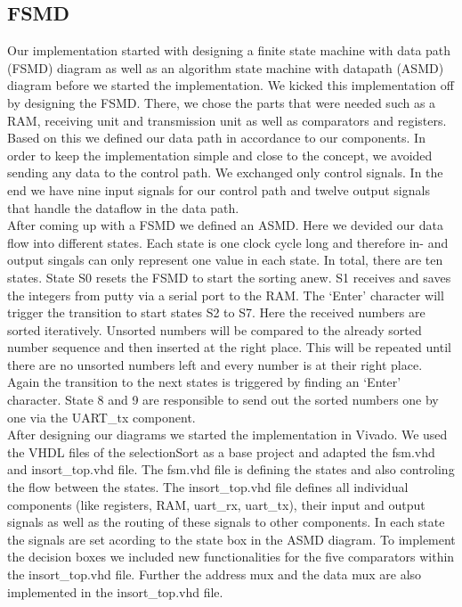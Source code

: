 \documentclass[conference]{IEEEtran}
\begin{document}
\subsection{FSMD}\label{section:fsmd}
Our implementation started with designing a finite state machine with data path (FSMD) diagram as well as an algorithm state machine with datapath (ASMD) diagram before we started the implementation. We kicked this implementation off by designing the FSMD. There, we chose the parts that were needed such as a RAM, receiving unit and transmission unit as well as comparators and registers. Based on this we defined our data path in accordance to our components. In order to keep the implementation simple and close to the concept, we avoided sending any data to the control path. We exchanged only control signals. In the end we have nine input signals for our control path and twelve output signals that handle the dataflow in the data path.\\
After coming up with a FSMD we defined an ASMD. Here we devided our data flow into different states. Each state is one clock cycle long and therefore in- and output singals can only represent one value in each state. In total, there are ten states. State S0 resets the FSMD to start the sorting anew. S1 receives and saves the integers from putty via a serial port to the RAM. The `Enter' character will trigger the transition to start states S2 to S7. Here the received numbers are sorted iteratively. Unsorted numbers will be compared to the already sorted number sequence and then inserted at the right place. This will be repeated until there are no unsorted numbers left and every number is at their right place. Again the transition to the next states is triggered by finding an `Enter' character. State 8 and 9 are responsible to send out the sorted numbers one by one via the UART\_tx component.\\
After designing our diagrams we started the implementation in Vivado. We used the VHDL files of the selectionSort as a base project and adapted the fsm.vhd and insort\_top.vhd file. The fsm.vhd file is defining the states and also controling the flow between the states. The insort\_top.vhd file defines all individual components (like registers, RAM, uart\_rx, uart\_tx), their input and output signals as well as the routing of these signals to other components. In each state the signals are set acording to the state box in the ASMD diagram. To implement the decision boxes we included new functionalities for the five comparators within the insort\_top.vhd file. Further the address mux and the data mux are also implemented in the insort\_top.vhd file.\\
\end{document}
